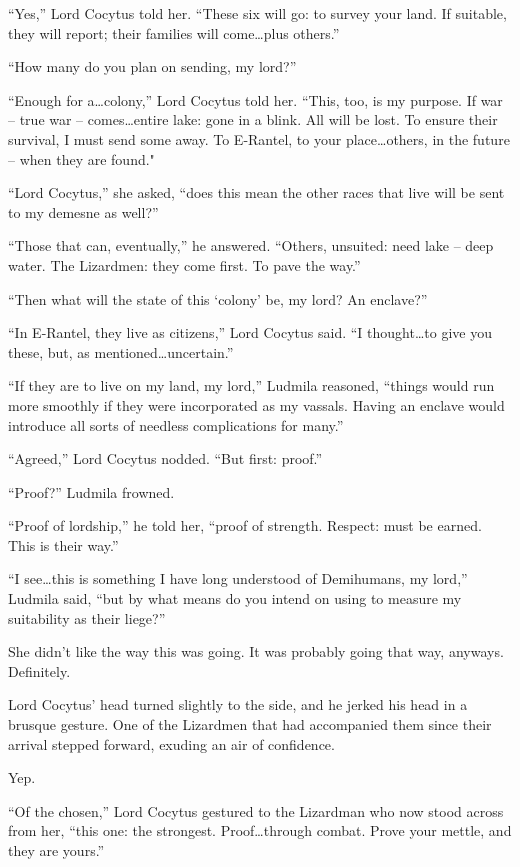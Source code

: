  

“Yes,” Lord Cocytus told her. “These six will go: to survey your land. If suitable, they will report; their families will come…plus others.”

 

“How many do you plan on sending, my lord?”

 

“Enough for a…colony,” Lord Cocytus told her. “This, too, is my purpose. If war – true war – comes…entire lake: gone in a blink. All will be lost. To ensure their survival, I must send some away. To E-Rantel, to your place…others, in the future – when they are found."

 

“Lord Cocytus,” she asked, “does this mean the other races that live will be sent to my demesne as well?”

 

“Those that can, eventually,” he answered. “Others, unsuited: need lake – deep water. The Lizardmen: they come first. To pave the way.”

 

“Then what will the state of this ‘colony’ be, my lord? An enclave?”

 

“In E-Rantel, they live as citizens,” Lord Cocytus said. “I thought…to give you these, but, as mentioned…uncertain.”

 

“If they are to live on my land, my lord,” Ludmila reasoned, “things would run more smoothly if they were incorporated as my vassals. Having an enclave would introduce all sorts of needless complications for many.”

 

“Agreed,” Lord Cocytus nodded. “But first: proof.”

 

“Proof?” Ludmila frowned.

 

“Proof of lordship,” he told her, “proof of strength. Respect: must be earned. This is their way.”

 

“I see…this is something I have long understood of Demihumans, my lord,” Ludmila said, “but by what means do you intend on using to measure my suitability as their liege?”

 

She didn’t like the way this was going. It was probably going that way, anyways. Definitely.

 

Lord Cocytus’ head turned slightly to the side, and he jerked his head in a brusque gesture. One of the Lizardmen that had accompanied them since their arrival stepped forward, exuding an air of confidence.

 

Yep.

 

“Of the chosen,” Lord Cocytus gestured to the Lizardman who now stood across from her, “this one: the strongest. Proof…through combat. Prove your mettle, and they are yours.”